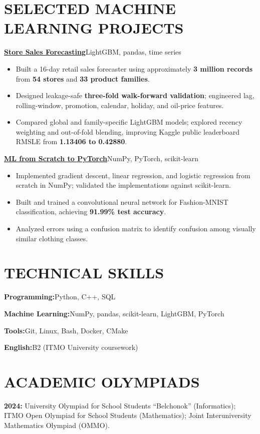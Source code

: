 \documentclass[10pt,a4paper]{article}
\newcommand{\project}[3]{%
  \noindent\textbf{\href{#2}{#1}}\hfill{\small\color{muted}#3}\par\vspace{-4pt}%
}
\newcommand{\skill}[2]{\textbf{#1}\hspace{4pt}#2\par\vspace{2pt}}
\begin{document}
\section*{SELECTED MACHINE LEARNING PROJECTS}
\project{Store Sales Forecasting}{https://github.com/Antichnoste/store-sales-forecasting}{LightGBM, pandas, time series}
\begin{itemize}
  \item Built a 16-day retail sales forecaster using approximately \textbf{3 million records} from \textbf{54 stores} and \textbf{33 product families}.
  \item Designed leakage-safe \textbf{three-fold walk-forward validation}; engineered lag, rolling-window, promotion, calendar, holiday, and oil-price features.
  \item Compared global and family-specific LightGBM models; explored recency weighting and out-of-fold blending, improving Kaggle public leaderboard RMSLE from \textbf{1.13406 to 0.42880}.
\end{itemize}
\vspace{4pt}
\project{ML from Scratch to PyTorch}{https://github.com/Antichnoste/ml-from-scratch-to-pytorch}{NumPy, PyTorch, scikit-learn}
\begin{itemize}
  \item Implemented gradient descent, linear regression, and logistic regression from scratch in NumPy; validated the implementations against scikit-learn.
  \item Built and trained a convolutional neural network for Fashion-MNIST classification, achieving \textbf{91.99\% test accuracy}.
  \item Analyzed errors using a confusion matrix to identify confusion among visually similar clothing classes.
\end{itemize}

\section*{TECHNICAL SKILLS}
\skill{Programming:}{Python, C++, SQL}
\skill{Machine Learning:}{NumPy, pandas, scikit-learn, LightGBM, PyTorch}
\skill{Tools:}{Git, Linux, Bash, Docker, CMake}
\skill{English:}{B2 (ITMO University coursework)}

\section*{ACADEMIC OLYMPIADS}
\textbf{2024:} University Olympiad for School Students ``Belchonok'' (Informatics); ITMO Open Olympiad for School Students (Mathematics); Joint Interuniversity Mathematics Olympiad (OMMO).
\end{document}
